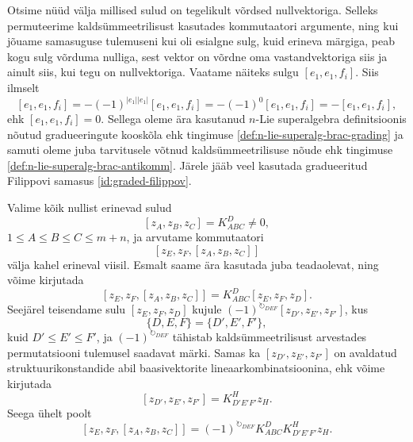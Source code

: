 Otsime nüüd välja millised sulud on tegelikult võrdsed nullvektoriga. Selleks
permuteerime kaldsümmeetrilisust kasutades kommutaatori argumente, ning kui
jõuame samasuguse tulemuseni kui oli esialgne sulg, kuid erineva märgiga,
peab kogu sulg võrduma nulliga, sest vektor on võrdne oma vastandvektoriga
siis ja ainult siis, kui tegu on nullvektoriga. Vaatame näiteks sulgu
$[e_1, e_1, f_i]$. Siis ilmselt
\[
    [e_1, e_1, f_i] = -(-1)^{|e_1||e_1|} [e_1, e_1, f_i] =
    -(-1)^0 [e_1, e_1, f_i] = - [e_1, e_1, f_i],
\]
ehk $[e_1, e_1, f_i] = 0$.
Sellega oleme ära kasutanud $n$-Lie superalgebra definitsioonis nõutud
gradueeringute kooskõla ehk tingimuse \eqref{def:n-lie-superalg-brac-grading}
ja samuti oleme juba tarvitusele võtnud kaldsümmeetrilisuse nõude ehk
tingimuse \eqref{def:n-lie-superalg-brac-antikomm}. Järele jääb veel kasutada
gradueeritud Filippovi samasus \eqref{id:graded-filippov}.

Valime kõik nullist erinevad sulud
\[ [z_A, z_B, z_C] = K_{ABC}^D \ne 0, \]
$1 \leq A \leq B \leq C \leq m+n$, ja arvutame kommutaatori
\[ \left[ z_E, z_F, [z_A, z_B, z_C] \right] \]
välja kahel erineval viisil. Esmalt saame ära kasutada juba teadaolevat,
ning võime kirjutada
\[
    \left[ z_E, z_F, [z_A, z_B, z_C] \right] = K_{ABC}^D [z_E, z_F, z_D].
\]
Seejärel teisendame sulu $[z_E, z_F, z_D]$ kujule
$(-1)^{\circlearrowright_{DEF}} [z_{D'}, z_{E'}, z_{F'}]$, kus
\[ \{D, E, F\} = \{D', E', F'\}, \]
kuid $D' \leq E' \leq F'$, ja  $(-1)^{\circlearrowright_{DEF}}$ tähistab
kaldsümmeetrilisust arvestades permutatsiooni tulemusel saadavat märki.
Samas ka $[z_{D'}, z_{E'}, z_{F'}]$ on avaldatud struktuurikonstandide
abil baasivektorite lineaarkombinatsioonina, ehk võime kirjutada
\[
    [z_{D'}, z_{E'}, z_{F'}] =
    K_{D' E' F'}^H z_H.
\]
Seega ühelt poolt
\[
    \left[ z_E, z_F, [z_A, z_B, z_C] \right] =
    (-1)^{\circlearrowright_{DEF}} K_{ABC}^D K_{D' E' F'}^H z_H.
\]

